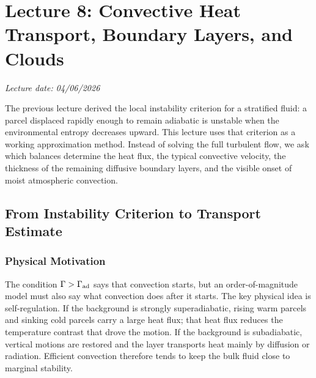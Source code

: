 \section{Lecture 8: Convective Heat Transport, Boundary Layers, and Clouds}
\label{sec:lec08}
\date{04/06/2026}

\begin{center}
    \textit{Lecture date: 04/06/2026}
\end{center}

The previous lecture derived the local instability criterion for a stratified
fluid: a parcel displaced rapidly enough to remain adiabatic is unstable when
the environmental entropy decreases upward. This lecture uses that criterion
as a working approximation method. Instead of solving the full turbulent flow,
we ask which balances determine the heat flux, the typical convective velocity,
the thickness of the remaining diffusive boundary layers, and the visible
onset of moist atmospheric convection.

\subsection{From Instability Criterion to Transport Estimate}
\label{sec:lec08:instability-to-transport}

\subsubsection*{Physical Motivation}
The condition $\Gamma>\Gamma_{\rm ad}$ says that convection starts, but an
order-of-magnitude model must also say what convection does after it starts.
The key physical idea is self-regulation. If the background is strongly
superadiabatic, rising warm parcels and sinking cold parcels carry a large
heat flux; that heat flux reduces the temperature contrast that drove the
motion. If the background is subadiabatic, vertical motions are restored and
the layer transports heat mainly by diffusion or radiation. Efficient
convection therefore tends to keep the bulk fluid close to marginal stability.



